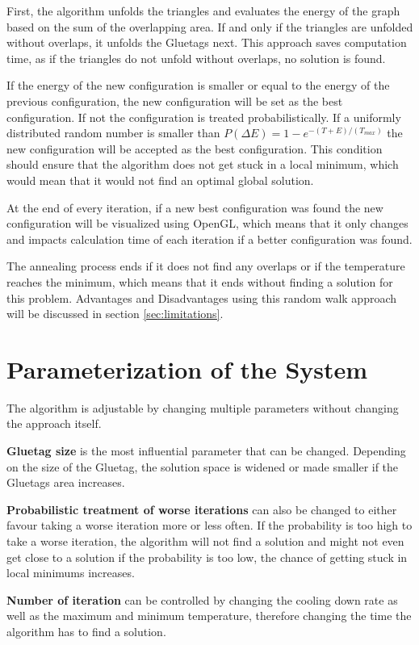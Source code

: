 \documentclass[draft,final]{vutinfth} %
\begin{document}
First, the algorithm unfolds the triangles and evaluates the energy of the graph based on the sum of the overlapping area. If and only if the triangles are unfolded without overlaps, it unfolds the Gluetags next. This approach saves computation time, as if the triangles do not unfold without overlaps, no solution is found.

If the energy of the new configuration is smaller or equal to the energy of the previous configuration, the new configuration will be set as the best configuration. If not the configuration is treated probabilistically. If a uniformly distributed random number is smaller than $P(\Delta E) = 1 - e^{-(T + E)/(T_{max})}$ the new configuration will be accepted as the best configuration. This condition should ensure that the algorithm does not get stuck in a local minimum, which would mean that it would not find an optimal global solution.

At the end of every iteration, if a new best configuration was found the new configuration will be visualized using OpenGL, which means that it only changes and impacts calculation time of each iteration if a better configuration was found. 

The annealing process ends if it does not find any overlaps or if the temperature reaches the minimum, which means that it ends without finding a solution for this problem. Advantages and Disadvantages using this random walk approach will be discussed in section \ref{sec:limitations}.

\section{Parameterization of the System}
The algorithm is adjustable by changing multiple parameters without changing the approach itself.

\textbf{Gluetag size} is the most influential parameter that can be changed. Depending on the size of the Gluetag, the solution space is widened or made smaller if the Gluetags area increases.

\textbf{Probabilistic treatment of worse iterations} can also be changed to either favour taking a worse iteration more or less often. If the probability is too high to take a worse iteration, the algorithm will not find a solution and might not even get close to a solution if the probability is too low, the chance of getting stuck in local minimums increases.

\textbf{Number of iteration} can be controlled by changing the cooling down rate as well as the maximum and minimum temperature, therefore changing the time the algorithm has to find a solution.
\end{document}
